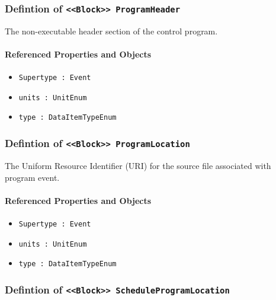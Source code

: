 \subsubsection{Defintion of \texttt{<<Block>> ProgramHeader}}
  \label{type:ProgramHeader}

\FloatBarrier

The non-executable header section of the control program.

\FloatBarrier
\paragraph{Referenced Properties and Objects}

\begin{itemize}
\item \texttt{Supertype : Event}

\item \texttt{units : UnitEnum}

\item \texttt{type : DataItemTypeEnum}

\end{itemize}
\FloatBarrier
\subsubsection{Defintion of \texttt{<<Block>> ProgramLocation}}
  \label{type:ProgramLocation}

\FloatBarrier

The Uniform Resource Identifier (URI) for the source file associated with program event.

\FloatBarrier
\paragraph{Referenced Properties and Objects}

\begin{itemize}
\item \texttt{Supertype : Event}

\item \texttt{units : UnitEnum}

\item \texttt{type : DataItemTypeEnum}

\end{itemize}
\FloatBarrier
\subsubsection{Defintion of \texttt{<<Block>> ScheduleProgramLocation}}
  \label{type:ScheduleProgramLocation}

